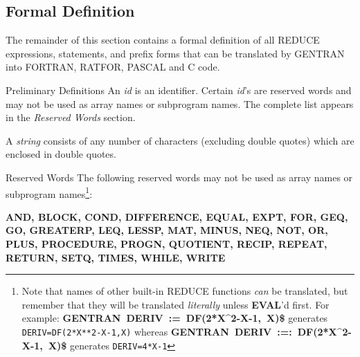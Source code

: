 \subsection{Formal Definition}
The remainder of this section contains a formal definition of all
REDUCE expressions, statements, and prefix forms that can be translated by
GENTRAN into FORTRAN, RATFOR, PASCAL and C code.

\begin{describe}{Preliminary Definitions}
An {\it id\/} is an identifier.  Certain {\it id\/}'s are reserved words
and may not be used as array names or subprogram names.  The
complete list appears in the {\it Reserved Words\/} section.

A {\it string\/} consists of any number of characters (excluding double
quotes) which are enclosed in double quotes.
\end{describe}

\begin{describe}{Reserved Words}
The following reserved words may not be used as array names or
subprogram names\footnote{Note that names of other built-in REDUCE functions
{\it can\/} be translated, but remember that they will be translated
{\it literally\/} unless {\bf EVAL}'d first.  For example:
{\bf GENTRAN~DERIV~:=~DF(2*X\^{}2-X-1,~X)\$}
generates {\tt DERIV=DF(2*X**2-X-1,X)}
whereas
{\bf GENTRAN~DERIV~:=:~DF(2*X\^{}2-X-1,~X)\$}
generates {\tt DERIV=4*X-1} }:

{\bf AND, BLOCK, COND, DIFFERENCE, EQUAL, EXPT, FOR, GEQ,
GO, GREATERP, LEQ, LESSP, MAT, MINUS, NEQ, NOT, OR,
PLUS, PROCEDURE, PROGN, QUOTIENT, RECIP, REPEAT,
RETURN, SETQ, TIMES, WHILE, WRITE}
\end{describe}

